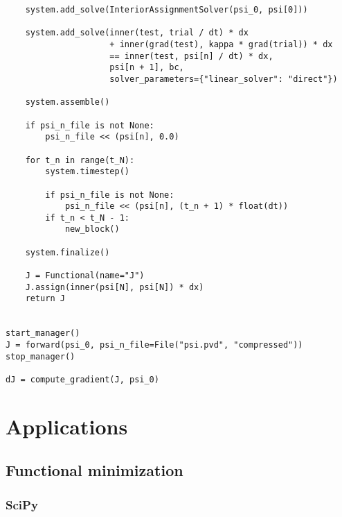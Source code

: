 \documentclass[11pt]{article}
\begin{document}
\begin{lstlisting}
    system.add_solve(InteriorAssignmentSolver(psi_0, psi[0]))

    system.add_solve(inner(test, trial / dt) * dx
                     + inner(grad(test), kappa * grad(trial)) * dx
                     == inner(test, psi[n] / dt) * dx,
                     psi[n + 1], bc,
                     solver_parameters={"linear_solver": "direct"})

    system.assemble()

    if psi_n_file is not None:
        psi_n_file << (psi[n], 0.0)

    for t_n in range(t_N):
        system.timestep()

        if psi_n_file is not None:
            psi_n_file << (psi[n], (t_n + 1) * float(dt))
        if t_n < t_N - 1:
            new_block()

    system.finalize()

    J = Functional(name="J")
    J.assign(inner(psi[N], psi[N]) * dx)
    return J


start_manager()
J = forward(psi_0, psi_n_file=File("psi.pvd", "compressed"))
stop_manager()

dJ = compute_gradient(J, psi_0)
\end{lstlisting}

\section{Applications}

\subsection{Functional minimization}\label{sect:minimization}

\subsubsection{SciPy}
\end{document}
